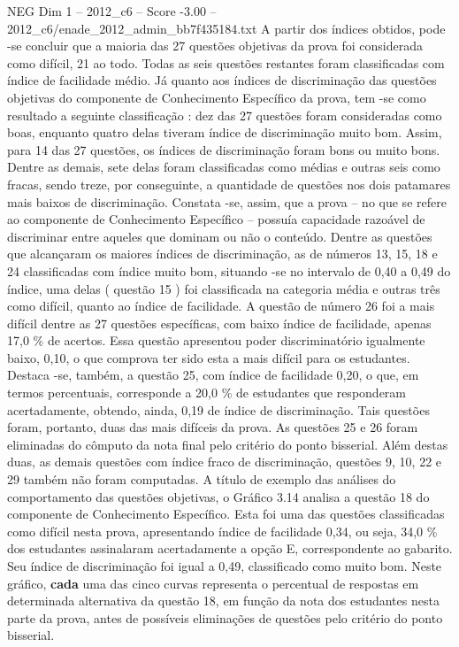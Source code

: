 \begin{textsample}{NEG Dim 1 – 2012\_c6 – Score -3.00 – 2012\_c6/enade\_2012\_admin\_bb7f435184.txt}
A partir dos índices obtidos, pode -se concluir que a maioria das 27 questões objetivas da prova foi considerada como difícil, 21 ao todo.
Todas as seis questões restantes foram classificadas com índice de facilidade médio.
Já quanto aos índices de discriminação das questões objetivas do componente de Conhecimento Específico da prova, tem -se como resultado a seguinte classificação : dez das 27 questões foram consideradas como boas, enquanto quatro delas tiveram índice de discriminação muito bom.
Assim, para 14 das 27 questões, os índices de discriminação foram bons ou muito bons.
Dentre as demais, sete delas foram classificadas como médias e outras seis como fracas, sendo treze, por conseguinte, a quantidade de questões nos dois patamares mais baixos de discriminação.
Constata -se, assim, que a prova – no que se refere ao componente de Conhecimento Específico – possuía capacidade razoável de discriminar entre aqueles que dominam ou não o conteúdo.
Dentre as questões que alcançaram os maiores índices de discriminação, as de números 13, 15, 18 e 24 classificadas com índice muito bom, situando -se no intervalo de 0,40 a 0,49 do índice, uma delas ( questão 15 ) foi classificada na categoria média e outras três como difícil, quanto ao índice de facilidade.
A questão de número 26 foi a mais difícil dentre as 27 questões específicas, com baixo índice de facilidade, apenas 17,0 \% de acertos.
Essa questão apresentou poder discriminatório igualmente baixo, 0,10, o que comprova ter sido esta a mais difícil para os estudantes.
Destaca -se, também, a questão 25, com índice de facilidade 0,20, o que, em termos percentuais, corresponde a 20,0 \% de estudantes que responderam acertadamente, obtendo, ainda, 0,19 de índice de discriminação.
Tais questões foram, portanto, duas das mais difíceis da prova.
As questões 25 e 26 foram eliminadas do cômputo da nota final pelo critério do ponto bisserial.
Além destas duas, as demais questões com índice fraco de discriminação, questões 9, 10, 22 e 29 também não foram computadas.
A título de exemplo das análises do comportamento das questões objetivas, o Gráfico 3.14 analisa a questão 18 do componente de Conhecimento Específico.
Esta foi uma das questões classificadas como difícil nesta prova, apresentando índice de facilidade 0,34, ou seja, 34,0 \% dos estudantes assinalaram acertadamente a opção E, correspondente ao gabarito.
Seu índice de discriminação foi igual a 0,49, classificado como muito bom.
Neste gráfico, \textbf{cada} uma das cinco curvas representa o percentual de respostas em determinada alternativa da questão 18, em função da nota dos estudantes nesta parte da prova, antes de possíveis eliminações de questões pelo critério do ponto bisserial.

\end{textsample}
